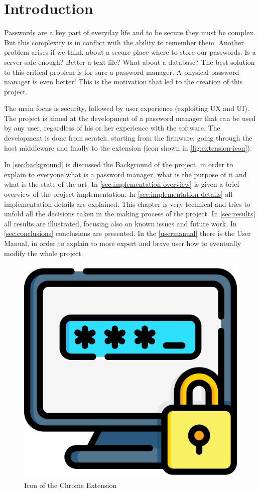 \chapter{Introduction}
Passwords are a key part of everyday life and to be secure they must be complex. But this complexity is in conflict with the ability to remember them. Another problem arises if we think about a secure place where to store our passwords. Is a server safe enough? Better a text file? What about a database?
The best solution to this critical problem is for sure a password manager. A physical password manager is even better! This is the motivation that led to the creation of this project.

The main focus is security, followed by user experience (exploiting UX and UI). The project is aimed at the development of a password manager that can be used by any user, regardless of his or her experience with the software. The development is done from scratch, starting from the firmware, going through the host middleware and finally to the extension (icon shown in \autoref{fig:extension-icon}).

In \autoref{sec:background} is discussed the Background of the project, in order to explain to everyone what is a password manager, what is the purpose of it and what is the state of the art. In \autoref{sec:implementation-overview} is given a brief overview of the project implementation. In \autoref{sec:implementation-details} all implementation details are explained. This chapter is very technical and tries to unfold all the decisions taken in the making process of the project.
In \autoref{sec:results} all results are illustrated, focusing also on known issues and future work. In \autoref{sec:conclusions} conclusions are presented. In the \autoref{usermanual} there is the User Manual, in order to explain to more expert and brave user how to eventually modify the whole project.

\vspace*{1cm}
\begin{figure}[H]
	\centering
	\includegraphics[width=0.4\linewidth]{images/extension/password.png}
	\caption{Icon of the Chrome Extension}
	\label{fig:extension-icon}
\end{figure}